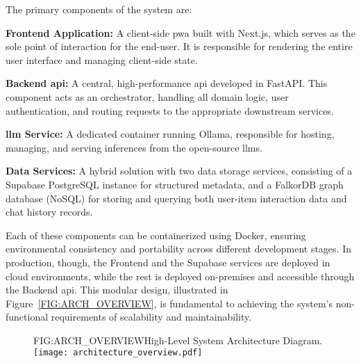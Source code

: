 The primary components of the system are:
\begin{compactitem}[\textbullet]
    \item \textbf{Frontend Application:} A client-side \ac{pwa} built with Next.js, which serves as the sole point of interaction for the end-user. It is responsible for rendering the entire user interface and managing client-side state.
    \item \textbf{Backend \acs{api}:} A central, high-performance \acs{api} developed in FastAPI. This component acts as an orchestrator, handling all domain logic, user authentication, and routing requests to the appropriate downstream services.
    \item \textbf{\acs{llm} Service:} A dedicated container running Ollama, responsible for hosting, managing, and serving inferences from the open-source \acp{llm}.
    \item \textbf{Data Services:} A hybrid solution with two data storage services, consisting of a Supabase \cite{SUPABASE} PostgreSQL instance for structured metadata, and a FalkorDB graph database (NoSQL) for storing and querying both user-item interaction data and chat history records.
\end{compactitem}

Each of these components can be containerized using Docker, ensuring environmental consistency and portability across different development stages. In production, though, the Frontend and the Supabase services are deployed in cloud environments, while the rest is deployed on-premises and accessible through the Backend \acs{api}. This modular design, illustrated in Figure~\ref{FIG:ARCH_OVERVIEW}, is fundamental to achieving the system's non-functional requirements of scalability and maintainability.

\begin{figure}[System Architecture Diagram]{FIG:ARCH_OVERVIEW}{High-Level System Architecture Diagram.}
    \texttt{[image: architecture\_overview.pdf]}
\end{figure}

